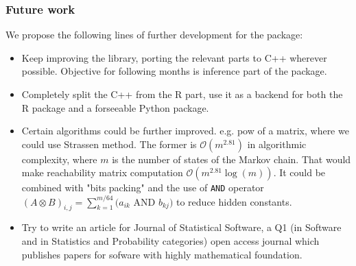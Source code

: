 \begin{frame}\frametitle{Future work}
 \vspace{2em}\fontsize{10pt}{0}\selectfont
 We propose the following lines of further development for the package:
 \begin{itemize}
 \item Keep improving the library, porting the relevant parts to C++ wherever
 possible. Objective for following months is inference part of the package.
 \item Completely split the C++ from the R part, use it as a backend for both the R 
 package and a forseeable Python package.
 \item Certain algorithms could be further improved. e.g. pow of a matrix, where we 
 could use Strassen method. The former is $\mathcal{O}(m^{2.81})$ in algorithmic 
 complexity, where $m$ is the number of states of the Markov chain. That would make 
 reachability matrix computation $\mathcal{O}(m^{2.81} \log(m))$. It could be combined 
 with "bits packing" and the use of \texttt{AND} operator
 $(A \otimes B)_{i,j} = \sum_{k = 1}^{m/64} \bigg(a_{ik} \textrm{ AND } b_{kj}\bigg)$
 to reduce hidden constants.
 \item Try to write an article for Journal of Statistical Software, a Q1 (in Software 
 and in Statistics and Probability categories) open access journal which publishes papers
 for sofware with highly mathematical foundation.
 \end{itemize}
\end{frame}
